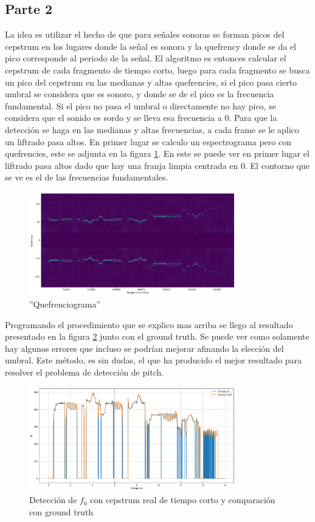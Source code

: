 \documentclass[a4paper]{article}
\begin{document}
\subsection{Parte 2}
La idea es utilizar el hecho de que para señales sonoras se forman picos del cepstrum en los lugares donde la señal es sonora y la quefrency donde se da el pico corresponde al periodo de la señal. El algoritmo es entonces calcular el cepstrum de cada fragmento de tiempo corto, luego para cada fragmento se busca un pico del cepstrum en las medianas y altas quefrencies, si el pico pasa cierto umbral se considera que es sonoro, y donde se de el pico es la frecuencia fundamental. Si el pico no pasa el umbral o directamente no hay pico, se considera que el sonido es sordo y se lleva esa frecuencia a 0. Para que la detección se haga en las medianas y altas frecuencias, a cada frame se le aplico un liftrado pasa altos. 
En primer lugar se calculo un espectrograma pero con quefrencies, este se adjunta en la figura \ref{quefrenciograma}. En este se puede ver en primer lugar el liftrado pasa altos dado que hay una franja limpia centrada en 0. El contorno que se ve es el de las frecuencias fundamentales. 

\begin{figure}[h!]
\centering
\includegraphics[width=0.8\textwidth]{quefrenciograma.png}
\caption{''Quefrenciograma''}
\label{quefrenciograma}
\end{figure}
 Programando el procedimiento que se explico mas arriba se llego al resultado presentado en la figura \ref{deteccion} junto con el ground truth. Se puede ver como solamente hay algunos errores que incluso se podrían mejorar afinando la elección del umbral. Este método, es sin dudas, el que ha producido el mejor resultado para resolver el problema de detección de pitch.
\begin{figure}[h!]
\centering
\includegraphics[width=0.8\textwidth]{deteccion.png}
\caption{Detección de $f_0$ con cepstrum real de tiempo corto y comparación con ground truth}
\label{deteccion}
\end{figure}
\end{document}
